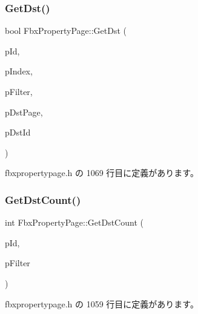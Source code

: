 \subsubsection{\texorpdfstring{Get\+Dst()}{GetDst()}}
{\footnotesize\ttfamily bool Fbx\+Property\+Page\+::\+Get\+Dst (\begin{DoxyParamCaption}\item[{\hyperlink{fbxtypes_8h_a088fa96de3b0b3ea69f0f6afef525dfb}{Fbx\+Int}}]{p\+Id,  }\item[{int}]{p\+Index,  }\item[{\hyperlink{class_fbx_connection_point_filter}{Fbx\+Connection\+Point\+Filter} $\ast$}]{p\+Filter,  }\item[{\hyperlink{class_fbx_property_page}{Fbx\+Property\+Page} $\ast$$\ast$}]{p\+Dst\+Page,  }\item[{\hyperlink{fbxtypes_8h_a088fa96de3b0b3ea69f0f6afef525dfb}{Fbx\+Int} $\ast$}]{p\+Dst\+Id }\end{DoxyParamCaption})\hspace{0.3cm}{\ttfamily [inline]}}



 fbxpropertypage.\+h の 1069 行目に定義があります。

\mbox{\label{class_fbx_property_page_ac6960f9f9a4d0e29f33d4f338484500a}} 
\subsubsection{\texorpdfstring{Get\+Dst\+Count()}{GetDstCount()}}
{\footnotesize\ttfamily int Fbx\+Property\+Page\+::\+Get\+Dst\+Count (\begin{DoxyParamCaption}\item[{\hyperlink{fbxtypes_8h_a088fa96de3b0b3ea69f0f6afef525dfb}{Fbx\+Int}}]{p\+Id,  }\item[{\hyperlink{class_fbx_connection_point_filter}{Fbx\+Connection\+Point\+Filter} $\ast$}]{p\+Filter }\end{DoxyParamCaption})\hspace{0.3cm}{\ttfamily [inline]}}



 fbxpropertypage.\+h の 1059 行目に定義があります。

\mbox{\label{class_fbx_property_page_aa1fc02c30ebc9c9e84015b5a98a2a285}} 
